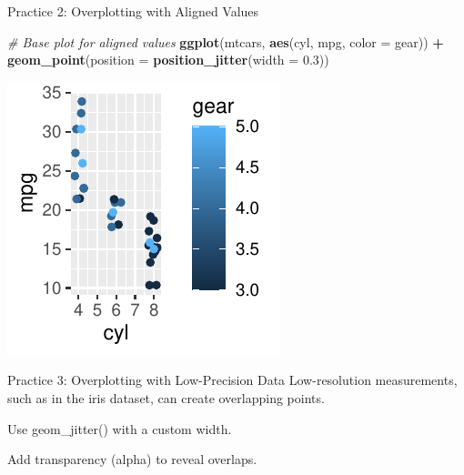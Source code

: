 \documentclass[
  ignorenonframetext,
]{beamer}
\newenvironment{Shaded}{\begin{snugshade}}{\end{snugshade}}
\newcommand{\AttributeTok}[1]{\textcolor[rgb]{0.13,0.29,0.53}{#1}}
\newcommand{\CommentTok}[1]{\textcolor[rgb]{0.56,0.35,0.01}{\textit{#1}}}
\newcommand{\FloatTok}[1]{\textcolor[rgb]{0.00,0.00,0.81}{#1}}
\newcommand{\FunctionTok}[1]{\textcolor[rgb]{0.13,0.29,0.53}{\textbf{#1}}}
\newcommand{\NormalTok}[1]{#1}
\newcommand{\SpecialCharTok}[1]{\textcolor[rgb]{0.81,0.36,0.00}{\textbf{#1}}}
\begin{document}
\begin{frame}[fragile]{Practice 2: Overplotting with Aligned Values}
\label{practice-2-overplotting-with-aligned-values-2}

\begin{Shaded}
\begin{Highlighting}[]
\CommentTok{\# Base plot for aligned values}
\FunctionTok{ggplot}\NormalTok{(mtcars, }\FunctionTok{aes}\NormalTok{(cyl, mpg, }\AttributeTok{color =}\NormalTok{ gear)) }\SpecialCharTok{+} \FunctionTok{geom\_point}\NormalTok{(}\AttributeTok{position =} \FunctionTok{position\_jitter}\NormalTok{(}\AttributeTok{width =} \FloatTok{0.3}\NormalTok{))}
\end{Highlighting}
\end{Shaded}

\begin{center}\includegraphics[width=0.5\linewidth]{Figs/unnamed-chunk-34-1} \end{center}
\end{frame}

\begin{frame}{Practice 3: Overplotting with Low-Precision Data}
\label{practice-3-overplotting-with-low-precision-data}
Low-resolution measurements, such as in the iris dataset, can create
overlapping points.

Use geom\_jitter() with a custom width.

Add transparency (alpha) to reveal overlaps.
\end{frame}
\end{document}
